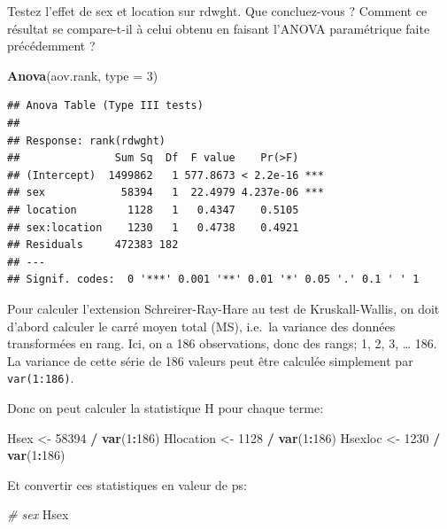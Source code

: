 \documentclass[12pt,]{book}
\newenvironment{Shaded}{\begin{snugshade}}{\end{snugshade}}
\newcommand{\CommentTok}[1]{\textcolor[rgb]{0.37,0.37,0.37}{\textit{#1}}}
\newcommand{\DataTypeTok}[1]{\textcolor[rgb]{0.27,0.27,0.27}{#1}}
\newcommand{\DecValTok}[1]{\textcolor[rgb]{0.06,0.06,0.06}{#1}}
\newcommand{\KeywordTok}[1]{\textcolor[rgb]{0.27,0.27,0.27}{\textbf{#1}}}
\newcommand{\NormalTok}[1]{#1}
\newcommand{\OperatorTok}[1]{\textcolor[rgb]{0.43,0.43,0.43}{\textbf{#1}}}
\newcommand{\StringTok}[1]{\textcolor[rgb]{0.5,0.5,0.5}{#1}}
\begin{document}
Testez l'effet de sex et location sur rdwght. Que concluez-vous ? Comment ce résultat se compare-t-il à celui obtenu en faisant l'ANOVA paramétrique faite précédemment ?

\begin{Shaded}
\begin{Highlighting}[]
\KeywordTok{Anova}\NormalTok{(aov.rank, }\DataTypeTok{type =} \DecValTok{3}\NormalTok{)}
\end{Highlighting}
\end{Shaded}

\begin{verbatim}
## Anova Table (Type III tests)
## 
## Response: rank(rdwght)
##               Sum Sq  Df  F value    Pr(>F)    
## (Intercept)  1499862   1 577.8673 < 2.2e-16 ***
## sex            58394   1  22.4979 4.237e-06 ***
## location        1128   1   0.4347    0.5105    
## sex:location    1230   1   0.4738    0.4921    
## Residuals     472383 182                       
## ---
## Signif. codes:  0 '***' 0.001 '**' 0.01 '*' 0.05 '.' 0.1 ' ' 1
\end{verbatim}

Pour calculer l'extension Schreirer-Ray-Hare au test de Kruskall-Wallis, on doit d'abord calculer le carré moyen total (MS), i.e.~la variance des données transformées en rang. Ici, on a 186 observations, donc des rangs; 1, 2, 3, \ldots{} 186. La variance de cette série de 186 valeurs peut être calculée simplement par \texttt{var(1:186)}.

Donc on peut calculer la statistique H pour chaque terme:

\begin{Shaded}
\begin{Highlighting}[]
\NormalTok{Hsex <-}\StringTok{ }\DecValTok{58394} \OperatorTok{/}\StringTok{ }\KeywordTok{var}\NormalTok{(}\DecValTok{1}\OperatorTok{:}\DecValTok{186}\NormalTok{)}
\NormalTok{Hlocation <-}\StringTok{ }\DecValTok{1128} \OperatorTok{/}\StringTok{ }\KeywordTok{var}\NormalTok{(}\DecValTok{1}\OperatorTok{:}\DecValTok{186}\NormalTok{)}
\NormalTok{Hsexloc <-}\StringTok{ }\DecValTok{1230} \OperatorTok{/}\StringTok{ }\KeywordTok{var}\NormalTok{(}\DecValTok{1}\OperatorTok{:}\DecValTok{186}\NormalTok{)}
\end{Highlighting}
\end{Shaded}

Et convertir ces statistiques en valeur de ps:

\begin{Shaded}
\begin{Highlighting}[]
\CommentTok{# sex}
\NormalTok{Hsex}
\end{Highlighting}
\end{Shaded}
\end{document}
